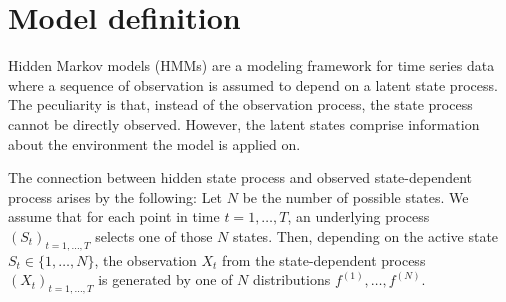 \documentclass[article]{jss}
\begin{document}


\section{Model definition} \label{sec:model_definition} %

Hidden Markov models (HMMs) are a modeling framework for time series data where a sequence of observation is assumed to depend on a latent state process. The peculiarity is that, instead of the observation process, the state process cannot be directly observed. However, the latent states comprise information about the environment the model is applied on. 

The connection between hidden state process and observed state-dependent process arises by the following: Let $N$ be the number of possible states. We assume that for each point in time $t = 1, \ldots, T$, an underlying process $(S_t)_{t = 1, \ldots, T}$ selects one of those $N$ states. Then, depending on the active state $S_t \in \{ 1, \ldots, N \}$, the observation $X_t$ from the state-dependent process $(X_t)_{t = 1, \ldots, T}$ is generated by one of $N$ distributions $f^{(1)},\dots,f^{(N)}.$
\end{document}

